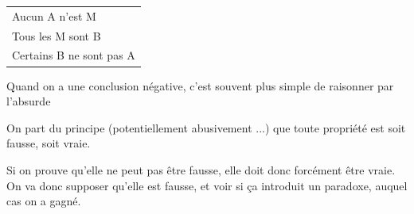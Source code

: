 \begin{frame}
	
	\begin{description}[labelindent=6pt,style=multiline,leftmargin=1.3in]
		 \setlength\itemsep{1em}

\item[Mode + figure] \begin{tabular}{l}
Aucun A n'est M\\ 
Tous les M sont B\\ 
\cline{1-1}
Certains B ne sont pas A
\end{tabular} \newline
	\end{description} \pause
Quand on a une conclusion négative, c'est souvent plus simple de raisonner par l'absurde\pause \newline

On part du principe (potentiellement abusivement ...) que toute propriété est soit fausse, soit vraie.\newline \pause

Si on prouve qu'elle ne peut pas être fausse, elle doit donc forcément être vraie. \pause On va donc supposer qu'elle est fausse, et voir si ça introduit un paradoxe, auquel cas on a gagné.
\end{frame}


